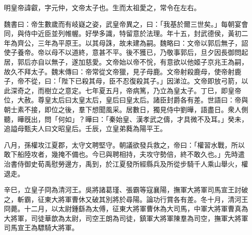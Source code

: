 
\begin{pinyinscope}
明皇帝諱叡，字元仲，文帝太子也。生而太祖愛之，常令在左右。

魏書曰：帝生數歲而有岐嶷之姿，武皇帝異之，曰：「我基於爾三世矣。」每朝宴會同，與侍中近臣並列帷幄。好學多識，特留意於法理。年十五，封武德侯，黃初二年為齊公，三年為平原王。以其母誅，故未建為嗣。魏略曰：文帝以郭后無子，詔使子養帝。帝以母不以道終，意甚不平。後不獲已，乃敬事郭后，旦夕因長御問起居，郭后亦自以無子，遂加慈愛。文帝始以帝不恱，有意欲以他姬子京兆王為嗣，故久不拜太子。魏末傳曰：帝常從文帝獵，見子母鹿。文帝射殺鹿母，使帝射鹿子，帝不從，曰：「陛下已殺其母，臣不忍復殺其子。」因涕泣。文帝即放弓箭，以此深奇之，而樹立之意定。七年夏五月，帝病篤，乃立為皇太子。丁巳，即皇帝位，大赦。尊皇太后曰太皇太后，皇后曰皇太后。諸臣封爵各有差。世語曰：帝與朝士素不接，即位之後，羣下想聞風采。居數日，獨見侍中劉曄，語盡日。衆人側聽，曄旣出，問「何如」？曄曰：「秦始皇、漢孝武之儔，才具微不及耳。」癸未，追謚母甄夫人曰文昭皇后。壬辰，立皇弟蕤為陽平王。

八月，孫權攻江夏郡，太守文聘堅守。朝議欲發兵救之，帝曰：「權習水戰，所以敢下船陸攻者，幾掩不備也。今已與聘相持，夫攻守勢倍，終不敢久也。」先時遣治書侍御史荀禹慰勞邊方，禹到，於江夏發所經縣兵及所從步騎千人乘山舉火，權退走。

辛巳，立皇子冏為清河王。吳將諸葛瑾、張霸等寇襄陽，撫軍大將軍司馬宣王討破之，斬霸，征東大將軍曹休又破其別將於尋陽。論功行賞各有差。冬十月，清河王冏薨。十二月，以太尉鍾繇為太傅，征東大將軍曹休為大司馬，中軍大將軍曹真為大將軍，司徒華歆為太尉，司空王朗為司徒，鎮軍大將軍陳羣為司空，撫軍大將軍司馬宣王為驃騎大將軍。


\end{pinyinscope}
